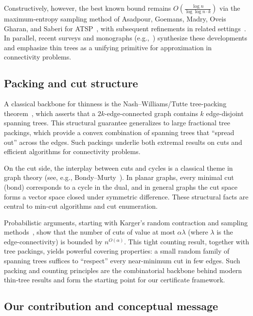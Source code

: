 \documentclass[11pt,letterpaper]{article}
\begin{document}
Constructively, however, the best known bound remains
$O(\tfrac{\log n}{\log\log n \cdot k})$ via the maximum-entropy sampling method
of Asadpour, Goemans, Madry, Oveis Gharan, and Saberi for
ATSP~\cite{asadpour2017}, with subsequent refinements in related
settings~\cite{anariog2015focs}. In parallel, recent surveys and
monographs (e.g.,~\cite{TraubVygen2024}) synthesize these developments and
emphasize thin trees as a unifying primitive for approximation in connectivity
problems.

\subsection{Packing and cut structure}
A classical backbone for thinness is the Nash--Williams/Tutte tree-packing
theorem~\cite{nashwilliams1961,tutte1961}, which asserts that a $2k$-edge-connected
graph contains $k$ edge-disjoint spanning trees. This structural guarantee
generalizes to large fractional tree packings, which provide a convex
combination of spanning trees that ``spread out'' across the edges. Such
packings underlie both extremal results on cuts and efficient algorithms for
connectivity problems.

On the cut side, the interplay between cuts and cycles is a classical theme in
graph theory (see, e.g., Bondy--Murty~\cite{bondy1976graph}). In planar graphs,
every minimal cut (bond) corresponds to a cycle in the dual, and in general
graphs the cut space forms a vector space closed under symmetric difference.
These structural facts are central to min-cut algorithms and cut enumeration.

Probabilistic arguments, starting with Karger’s random contraction
and sampling methods~\cite{karger1998}, show that the number of cuts of value at
most $\alpha\lambda$ (where $\lambda$ is the edge-connectivity) is bounded by
$n^{O(\alpha)}$. This tight counting result, together with tree packings, yields
powerful covering properties: a small random family of spanning trees suffices
to ``respect'' every near-minimum cut in few edges. Such packing and counting
principles are the combinatorial backbone behind modern thin-tree results and
form the starting point for our certificate framework.

\subsection{Our contribution and conceptual message}
\end{document}
